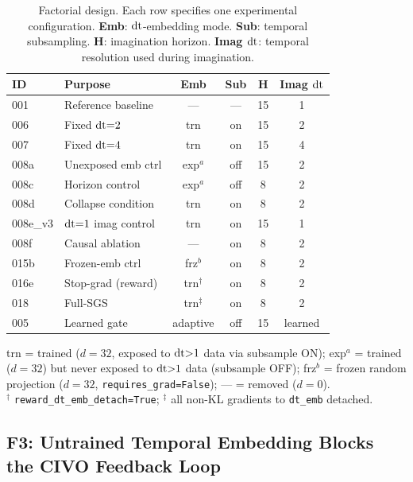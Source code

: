 \begin{table}[ht]
\centering
\caption{Factorial design. Each row specifies one experimental configuration. \textbf{Emb}: $\mathrm{dt}$-embedding mode. \textbf{Sub}: temporal subsampling. \textbf{H}: imagination horizon. \textbf{Imag $\mathrm{dt}$}: temporal resolution used during imagination.}
\label{tab:factorial_design}
\small
\setlength{\tabcolsep}{3.5pt}
\begin{tabular}{@{}llcccc@{}}
\toprule
\textbf{ID} & \textbf{Purpose} & \textbf{Emb} & \textbf{Sub} & \textbf{H} & \textbf{Imag $\mathrm{dt}$} \\
\midrule
001 & Reference baseline & --- & --- & 15 & 1 \\
006 & Fixed $\mathrm{dt}{=}2$ & trn & on & 15 & 2 \\
007 & Fixed $\mathrm{dt}{=}4$ & trn & on & 15 & 4 \\
\midrule
008a & Unexposed emb ctrl & exp$^a$ & off & 15 & 2 \\
008c & Horizon control & exp$^a$ & off & 8 & 2 \\
008d & Collapse condition & trn & on & 8 & 2 \\
008e\_v3 & $\mathrm{dt}{=}1$ imag control & trn & on & 15 & 1 \\
008f & Causal ablation & --- & on & 8 & 2 \\
\midrule
015b & Frozen-emb ctrl & frz$^b$ & on & 8 & 2 \\
016e & Stop-grad (reward) & trn$^\dagger$ & on & 8 & 2 \\
018 & Full-SGS & trn$^\ddagger$ & on & 8 & 2 \\
\midrule
005 & Learned gate & adaptive & off & 15 & learned \\
\bottomrule
\end{tabular}
\vspace{-2pt}
{\raggedright\footnotesize
trn = trained ($d{=}32$, exposed to $\mathrm{dt}{>}1$ data via subsample ON);
exp$^a$ = trained ($d{=}32$) but never exposed to $\mathrm{dt}{>}1$ data (subsample OFF);
frz$^b$ = frozen random projection ($d{=}32$, \texttt{requires\_grad=False});
--- = removed ($d{=}0$).\\
$^\dagger$ \texttt{reward\_dt\_emb\_detach=True}; $^\ddagger$ all non-KL gradients to \texttt{dt\_emb} detached.\par}
\end{table}

\subsection{F3: Untrained Temporal Embedding Blocks the CIVO Feedback Loop}
\label{sec:f3}

